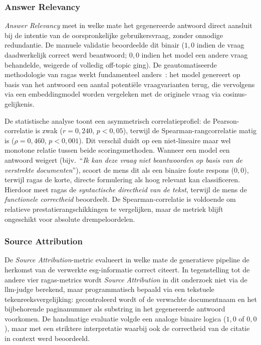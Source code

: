 \subsubsection{Answer Relevancy}

\textit{Answer Relevancy} meet in welke mate het gegenereerde antwoord direct aansluit bij de intentie van de oorspronkelijke gebruikersvraag, zonder onnodige redundantie. De manuele validatie beoordeelde dit binair ($1{,}0$ indien de vraag daadwerkelijk correct werd beantwoord; $0{,}0$ indien het model een andere vraag behandelde, weigerde of volledig off-topic ging). De geautomatiseerde methodologie van \gls{ragas} werkt fundamenteel anders~\autocite{VibrantLabs2025}: het model genereert op basis van het antwoord een aantal potentiële vraagvarianten terug, die vervolgens via een embeddingmodel worden vergeleken met de originele vraag via cosinus-gelijkenis.

De statistische analyse toont een asymmetrisch correlatieprofiel: de Pearson-correlatie is zwak ($r = 0{,}240$, $p < 0{,}05$), terwijl de Spearman-rangcorrelatie matig is ($\rho = 0{,}460$, $p < 0{,}001$). Dit verschil duidt op een niet-lineaire maar wel monotone relatie tussen beide scoringsmethoden. Wanneer een model een antwoord weigert (bijv.\ ``\textit{Ik kan deze vraag niet beantwoorden op basis van de verstrekte documenten}''), scoort de mens dit als een binaire foute respons ($0{,}0$), terwijl \gls{ragas} de korte, directe formulering als hoog relevant kan classificeren. Hierdoor meet \gls{ragas} de \textit{syntactische directheid van de tekst}, terwijl de mens de \textit{functionele correctheid} beoordeelt. De Spearman-correlatie is voldoende om relatieve prestatierangschikkingen te vergelijken, maar de metriek blijft ongeschikt voor absolute drempeloordelen.

\subsubsection{Source Attribution}

De \textit{Source Attribution}-metric evalueert in welke mate de generatieve pipeline de herkomst van de verwerkte \gls{esg}-informatie correct citeert. In tegenstelling tot de andere vier \gls{ragas}-metrics wordt \textit{Source Attribution} in dit onderzoek niet via de \gls{llm}-judge berekend, maar programmatisch bepaald via een tekstuele tekenreeksvergelijking: gecontroleerd wordt of de verwachte documentnaam en het bijbehorende paginanummer als substring in het gegenereerde antwoord voorkomen. De handmatige evaluatie volgde een analoge binaire logica ($1{,}0$ of $0{,}0$), maar met een striktere interpretatie waarbij ook de correctheid van de citatie in context werd beoordeeld.

